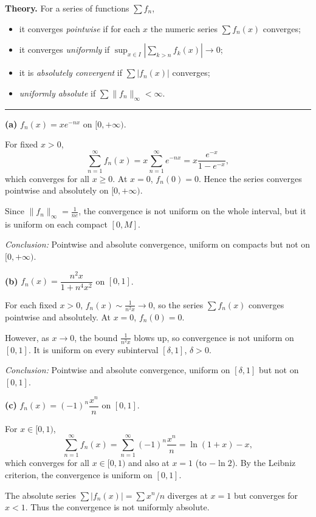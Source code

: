 \documentclass[12pt,a4paper]{article}
\theoremstyle{plain}
\theoremstyle{definition}
\theoremstyle{remark}
\theoremstyle{remark}
\newcommand{\sep}{\vspace{6pt}\hrule\vspace{8pt}}
\begin{document}
	\textbf{Theory.}
	For a series of functions $\sum f_n$,
	\begin{itemize}
		\item it converges \emph{pointwise} if for each $x$ the numeric series $\sum f_n(x)$ converges;
		\item it converges \emph{uniformly} if $\sup_{x\in I}|\sum_{k>n}f_k(x)|\to0$;
		\item it is \emph{absolutely convergent} if $\sum|f_n(x)|$ converges;
		\item \emph{uniformly absolute} if $\sum\|f_n\|_\infty<\infty$.
	\end{itemize}
	
	\sep
	
	\textbf{(a)} $f_n(x)=x e^{-nx}$ on $[0,+\infty)$.
	
	For fixed $x>0$,
	\[
	\sum_{n=1}^\infty f_n(x)
	=x\sum_{n=1}^\infty e^{-nx}
	=x\frac{e^{-x}}{1-e^{-x}},
	\]
	which converges for all $x\ge0$.
	At $x=0$, $f_n(0)=0$.
	Hence the series converges pointwise and absolutely on $[0,+\infty)$.
	
	Since $\|f_n\|_\infty=\frac{1}{ne}$,
	the convergence is not uniform on the whole interval,
	but it is uniform on each compact $[0,M]$.
	
	\textit{Conclusion:}
	Pointwise and absolute convergence, uniform on compacts but not on $[0,+\infty)$.
	
	\medskip
	
	\textbf{(b)} $f_n(x)=\dfrac{n^2x}{1+n^4x^2}$ on $[0,1]$.
	
	For each fixed $x>0$,
	$f_n(x)\sim\frac{1}{n^2x}\to0$,
	so the series $\sum f_n(x)$ converges pointwise and absolutely.
	At $x=0$, $f_n(0)=0$.
	
	However, as $x\to0$, the bound $\frac{1}{n^2x}$ blows up,
	so convergence is not uniform on $[0,1]$.
	It is uniform on every subinterval $[\delta,1]$, $\delta>0$.
	
	\textit{Conclusion:}
	Pointwise and absolute convergence, uniform on $[\delta,1]$ but not on $[0,1]$.
	
	\medskip
	
	\textbf{(c)} $f_n(x)=(-1)^n\dfrac{x^n}{n}$ on $[0,1]$.
	
	For $x\in[0,1)$,
	\[
	\sum_{n=1}^\infty f_n(x)
	=\sum_{n=1}^\infty (-1)^n\frac{x^n}{n}
	=\ln(1+x)-x,
	\]
	which converges for all $x\in[0,1)$ and also at $x=1$ (to $-\ln2$).
	By the Leibniz criterion, the convergence is uniform on $[0,1]$.
	
	The absolute series $\sum |f_n(x)|=\sum x^n/n$
	diverges at $x=1$ but converges for $x<1$.
	Thus the convergence is not uniformly absolute.
	
\end{document}
